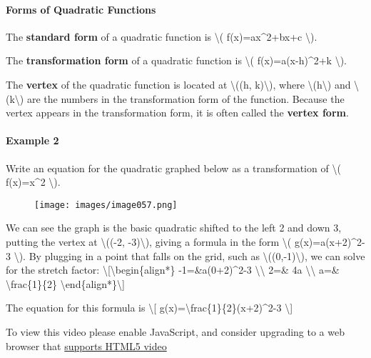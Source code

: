 \hypertarget{forms-of-quadratic-functions}{%
\paragraph{Forms of Quadratic
Functions}\label{forms-of-quadratic-functions}}

The \textbf{standard form} of a quadratic function is \textbackslash{}(
f(x)=ax\^{}2+bx+c \textbackslash{}).

The \textbf{transformation form} of a quadratic function is
\textbackslash{}( f(x)=a(x-h)\^{}2+k \textbackslash{}).

The \textbf{vertex} of the quadratic function is located at
\textbackslash{}((h, k)\textbackslash{}), where
\textbackslash{}(h\textbackslash{}) and
\textbackslash{}(k\textbackslash{}) are the numbers in the
transformation form of the function. Because the vertex appears in the
transformation form, it is often called the \textbf{vertex form}.

\hypertarget{example-2}{%
\paragraph{Example 2}\label{example-2}}

Write an equation for the quadratic graphed below as a transformation of
\textbackslash{}( f(x)=x\^{}2 \textbackslash{}).

\begin{figure}
\centering
\texttt{[image: images/image057.png]}
\caption{}
\end{figure}

We can see the graph is the basic quadratic shifted to the left 2 and
down 3, putting the vertex at \textbackslash{}((-2,
-3)\textbackslash{}), giving a formula in the form \textbackslash{}(
g(x)=a(x+2)\^{}2-3 \textbackslash{}). By plugging in a point that falls
on the grid, such as \textbackslash{}((0,-1)\textbackslash{}), we can
solve for the stretch factor:
\textbackslash{}{[}\textbackslash{}begin\{align*\} -1=\&a(0+2)\^{}2-3
\textbackslash{}\textbackslash{} 2=\& 4a
\textbackslash{}\textbackslash{} a=\& \textbackslash{}frac\{1\}\{2\}
\textbackslash{}end\{align*\}\textbackslash{}{]}

The equation for this formula is \textbackslash{}{[}
g(x)=\textbackslash{}frac\{1\}\{2\}(x+2)\^{}2-3 \textbackslash{}{]}

To view this video please enable JavaScript, and consider upgrading to a
web browser that \href{http://videojs.com/html5-video-support/}{supports
HTML5 video}

